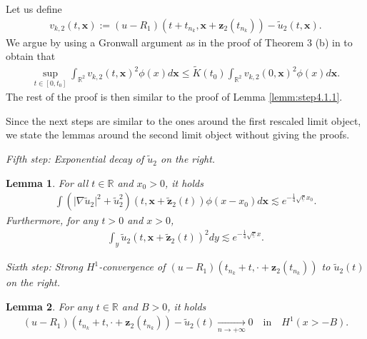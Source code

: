 \documentclass[reqno,10pt]{amsart}
\newtheorem{lemm}{Lemma}[section]
\numberwithin{equation}{section}
\newcommand{\bx}{\mathbf{x}}
\newcommand{\bz}{\mathbf{z}}
\begin{document}
Let us define
  \begin{align}\label{defi:v_k2}
      v_{k,2}(t,\bx) := \left( u - R_1 \right) \left(t+t_{n_k},\bx+ \bz_2(t_{n_k}) \right) -\tilde{u}_2(t,\bx).
  \end{align}
  We argue by using a Gronwall argument as in the proof of Theorem 3 (b) in \cite{MM08} to obtain that
  \begin{align*}
			\sup_{t \in [0,t_0]}\int_{\mathbb{R}^2} v_{k,2}(t,\bx)^2 \phi (x) d\bx \leq \tilde{K}(t_0) \int_{\mathbb{R}^2} v_{k,2}(0,\bx)^2 \phi (x) d\bx.
		\end{align*} 
  The rest of the proof is then similar to the proof of Lemma \ref{lemm:step4.1.1}.

\vspace{0.5cm}
Since the next steps are similar to the ones around the first rescaled limit object, we state the lemmas around the second limit object without giving the proofs. 

\vspace{0.5cm}
\noindent \textit{Fifth step: Exponential decay of $\tilde{u}_{2}$ on the right.}

\begin{lemm}
	For all $t \in \mathbb{R}$ and $x_0>0$, it holds
	\begin{align*}
		\int \left( \vert \nabla \tilde{u}_2 \vert^2 + \tilde{u}_2^2 \right) \left(t, \bx +\tilde{\bz}_2(t) \right) \phi (x-x_0) d\bx \lesssim e^{-\frac14 \sqrt{\underline{c}}x_0}.
	\end{align*}
	Furthermore, for any $t>0$ and $x>0$,
	\begin{align*}
		\int_y \tilde{u}_2 \left(t, \bx+ \tilde{\bz}_2(t) \right) ^2 dy \lesssim e^{-\frac14 \sqrt{\underline{c}}x}.
	\end{align*}
\end{lemm}


\vspace{0.5cm}
\noindent \textit{Sixth step: Strong $H^1$-convergence of $\left( u - R_1 \right) \left(t_{n_k}+t, \cdot + \bz_2(t_{n_k}) \right)$ to $\tilde{u}_{2}(t)$ on the right.}

\begin{lemm}
	For any $t\in \mathbb{R}$ and $B>0$, it holds
	\begin{align*}
		\left(u -R_1 \right) \left( t_{n_k}+t, \cdot + \bz_2(t_{n_k}) \right) - \tilde{u}_{2}(t) \underset{n \rightarrow + \infty}{\rightarrow} 0 \quad \text{in} \quad H^1(x>-B).
	\end{align*}
\end{lemm}
\end{document}
